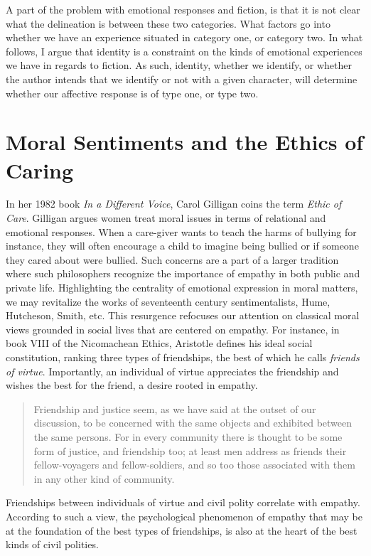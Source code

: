 \documentclass[
  12pt,
]{book}
\theoremstyle{definition}
\theoremstyle{definition}
\theoremstyle{definition}
\theoremstyle{definition}
\theoremstyle{remark}
\begin{document}
A part of the problem with emotional responses and fiction, is that it is not clear what the delineation is between these two categories. What factors go into whether we have an experience situated in category one, or category two. In what follows, I argue that identity is a constraint on the kinds of emotional experiences we have in regards to fiction. As such, identity, whether we identify, or whether the author intends that we identify or not with a given character, will determine whether our affective response is of type one, or type two.

\section{Moral Sentiments and the Ethics of Caring}\label{moral-sentiments-and-the-ethics-of-caring}

In her 1982 book \emph{In a Different Voice}, Carol Gilligan coins the term \emph{Ethic of Care}. Gilligan argues women treat moral issues in terms of relational and emotional responses. When a care-giver wants to teach the harms of bullying for instance, they will often encourage a child to imagine being bullied or if someone they cared about were bullied. Such concerns are a part of a larger tradition where such philosophers recognize the importance of empathy in both public and private life. Highlighting the centrality of emotional expression in moral matters, we may revitalize the works of seventeenth century sentimentalists, Hume, Hutcheson, Smith, etc. This resurgence refocuses our attention on classical moral views grounded in social lives that are centered on empathy. For instance, in book VIII of the Nicomachean Ethics, Aristotle defines his ideal social constitution, ranking three types of friendships, the best of which he calls \emph{friends of virtue}. Importantly, an individual of virtue appreciates the friendship and wishes the best for the friend, a desire rooted in empathy.

\begin{quote}
Friendship and justice seem, as we have said at the outset of our discussion, to be concerned with the same objects and exhibited between the same persons. For in every community there is thought to be some form of justice, and friendship too; at least men address as friends their fellow-voyagers and fellow-soldiers, and so too those associated with them in any other kind of community.
\end{quote}

Friendships between individuals of virtue and civil polity correlate with empathy. According to such a view, the psychological phenomenon of empathy that may be at the foundation of the best types of friendships, is also at the heart of the best kinds of civil polities.
\end{document}
